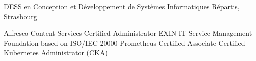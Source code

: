 %
%
%


\begin{scholarship}
					{DESS en Conception et Développement de Systèmes Informatiques Répartis, Strasbourg}
\end{scholarship}

\begin{scholarship}
					{Alfresco Content Services Certified Administrator}
					{EXIN IT Service Management Foundation based on ISO/IEC 20000}
					{Prometheus Certified Associate}
					{Certified Kubernetes Administrator (CKA)}
\end{scholarship}
